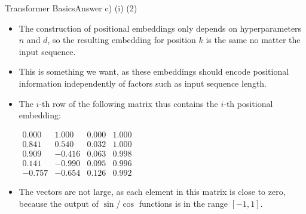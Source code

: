 \documentclass[t]{beamer}
\begin{document}
\begin{frame}{Transformer Basics}{Answer c) (i) (2)}
    \begin{itemize}
        \item The construction of positional embeddings only depends on
              hyperparameters $n$ and $d$, so the resulting embedding for
              position $k$ is the same no matter the input sequence.
        \item This is something we want, as these embeddings should
              encode positional information independently of factors such
              as input sequence length.
        \item The $i$-th row of the following matrix thus contains the
              $i$-th positional embedding:
              \begin{center}
                  $\begin{matrix}
                          0.000  & 1.000  & 0.000 & 1.000 \\
                          0.841  & 0.540  & 0.032 & 1.000 \\
                          0.909  & -0.416 & 0.063 & 0.998 \\
                          0.141  & -0.990 & 0.095 & 0.996 \\
                          -0.757 & -0.654 & 0.126 & 0.992
                      \end{matrix}$
              \end{center}
        \item The vectors are not large, as each element in this matrix is
              close to zero, because the output of $\sin$/$\cos$ functions is
              in the range $[-1,1]$.
    \end{itemize}
\end{frame}
\end{document}
